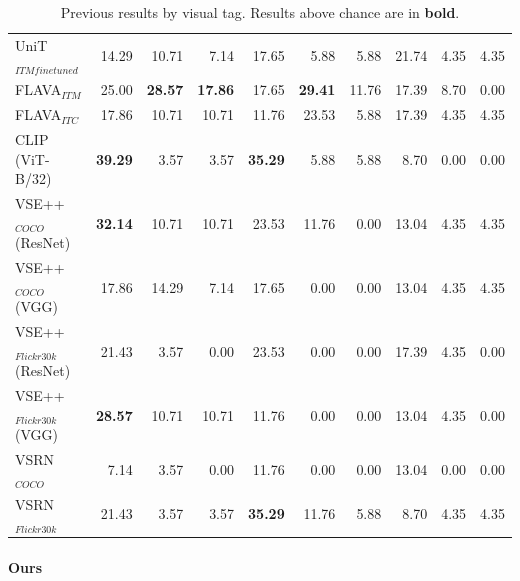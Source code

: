 \begin{table}[ht]
\begin{adjustbox}{max width=0.8\textwidth}
\begin{tabular}{l|rrr|rrr|rrr}
 UniT$_{ITM finetuned}$       & 14.29          & 10.71          & 7.14           & 17.65          & 5.88           & 5.88           & 21.74          & 4.35           & 4.35           \\
 FLAVA$_{ITM}$                & 25.00          & \textbf{28.57} & \textbf{17.86} & 17.65          & \textbf{29.41} & 11.76 & 17.39          &  8.70 &  0.00 \\
 FLAVA$_{ITC}$        & 17.86          & 10.71          & 10.71          & 11.76          & 23.53          & 5.88           & 17.39          & 4.35           &  4.35 \\
 CLIP (ViT-B/32)              & \textbf{39.29} & 3.57           & 3.57           & \textbf{35.29} & 5.88           & 5.88           & 8.70           & 0.00           & 0.00           \\
 VSE++$_{COCO}$ (ResNet)      & \textbf{32.14} & 10.71          & 10.71          & 23.53          & 11.76          & 0.00           & 13.04          & 4.35           & 4.35           \\
 VSE++$_{COCO}$ (VGG)         & 17.86          & 14.29          & 7.14           & 17.65          & 0.00           & 0.00           & 13.04          & 4.35           & 4.35           \\
 VSE++$_{Flickr30k}$ (ResNet) & 21.43          & 3.57           & 0.00           & 23.53          & 0.00           & 0.00           & 17.39          & 4.35           & 0.00           \\
 VSE++$_{Flickr30k}$ (VGG)    & \textbf{28.57} & 10.71          & 10.71          & 11.76          & 0.00           & 0.00           & 13.04          & 4.35           & 0.00           \\
 VSRN$_{COCO}$                & 7.14           & 3.57           & 0.00           & 11.76          & 0.00           & 0.00           & 13.04          & 0.00           & 0.00           \\
 VSRN$_{Flickr30k}$           & 21.43          & 3.57           & 3.57           & \textbf{35.29} & 11.76          & 5.88           & 8.70           & 4.35           & 4.35           \\
    \bottomrule
  \end{tabular}
  \end{adjustbox}
  \caption{Previous results by visual tag. Results above chance are in \textbf{bold}.}
    \label{tab:results-by-visual-tag-baseline}
\end{table}

\paragraph{Ours}

